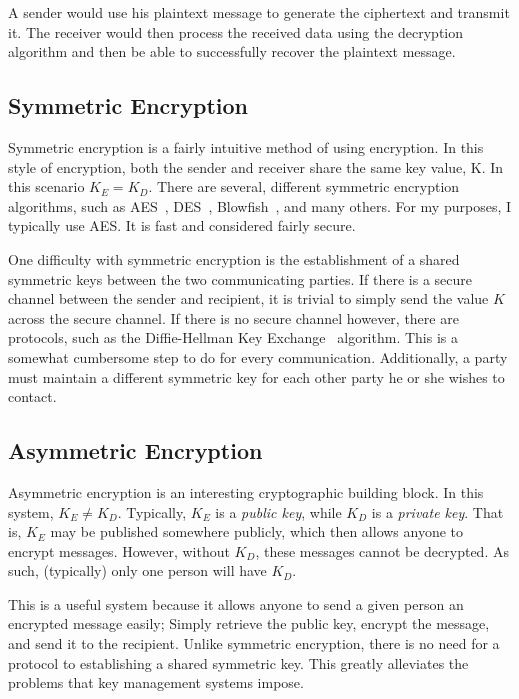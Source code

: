 A sender would use his plaintext message to generate the ciphertext and transmit it. The receiver would then process the received data using the decryption
algorithm and then be able to successfully recover the plaintext message.

\subsection{Symmetric Encryption}
Symmetric encryption is a fairly intuitive method of using encryption. In this style of encryption,
both the sender and receiver share the same key value, K. In this scenario $K_E = K_D$. There are several,
different symmetric encryption algorithms, such as AES~\cite{AES}, DES~\cite{DES}, Blowfish~\cite{Blowfish}, and many others.
For my purposes, I typically use AES. It is fast and considered fairly secure.

One difficulty with symmetric encryption is the establishment of a shared symmetric keys between the two communicating parties.
If there is a secure channel between the sender and recipient, it is trivial to simply send the value $K$ across the secure channel.
If there is no secure channel however, there are protocols, such as the Diffie-Hellman Key Exchange~\cite{diffiehellmankeyexchange} algorithm.
This is a somewhat cumbersome step to do for every communication. Additionally, a party must maintain a different symmetric key for each
other party he or she wishes to contact.

\subsection{Asymmetric Encryption}
Asymmetric encryption is an interesting cryptographic building block. In this system, $K_E \neq K_D$. Typically,
$K_E$ is a \emph{public key}, while $K_D$ is a \emph{private key}. That is, $K_E$ may be published somewhere publicly,
which then allows anyone to encrypt messages. However, without $K_D$, these messages cannot be decrypted. As such, (typically) only one person
will have $K_D$. 

This is a useful system because it allows anyone to send a given person an encrypted message easily; Simply retrieve the public key,
encrypt the message, and send it to the recipient. Unlike symmetric encryption, there is no need for a protocol to establishing a shared symmetric
key. This greatly alleviates the problems that key management systems impose.

